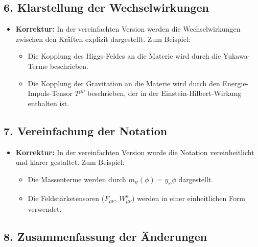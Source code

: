 \documentclass{article}
\begin{document}
\subsection{6. Klarstellung der Wechselwirkungen}

\begin{itemize}
	\item \textbf{Korrektur:} In der vereinfachten Version werden die Wechselwirkungen zwischen den Kräften explizit dargestellt. Zum Beispiel:
	\begin{itemize}
		\item Die Kopplung des Higgs-Feldes an die Materie wird durch die Yukawa-Terme beschrieben.
		\item Die Kopplung der Gravitation an die Materie wird durch den Energie-Impuls-Tensor $T^{\mu\nu}$ beschrieben, der in der Einstein-Hilbert-Wirkung enthalten ist.
	\end{itemize}
\end{itemize}

\subsection{7. Vereinfachung der Notation}

\begin{itemize}
	\item \textbf{Korrektur:} In der vereinfachten Version wurde die Notation vereinheitlicht und klarer gestaltet. Zum Beispiel:
	\begin{itemize}
		\item Die Massenterme werden durch $m_\psi(\phi) = y_\psi \phi$ dargestellt.
		\item Die Feldstärketensoren ($F_{\mu\nu}$, $W_{\mu\nu}^a$) werden in einer einheitlichen Form verwendet.
	\end{itemize}
\end{itemize}

\subsection{8. Zusammenfassung der Änderungen}
\end{document}
